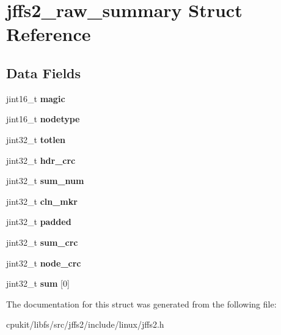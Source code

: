 \hypertarget{structjffs2__raw__summary}{}\section{jffs2\+\_\+raw\+\_\+summary Struct Reference}
\label{structjffs2__raw__summary}
\subsection*{Data Fields}
\begin{DoxyCompactItemize}
\item 
\mbox{\label{structjffs2__raw__summary_a9b7820bedbff940f5115575a9992bb35}} 
jint16\+\_\+t {\bfseries magic}
\item 
\mbox{\label{structjffs2__raw__summary_aae4018b2f35c0c29f6d223e17d5dda13}} 
jint16\+\_\+t {\bfseries nodetype}
\item 
\mbox{\label{structjffs2__raw__summary_abcd5e42e292e2c1759ccd2a9472643d0}} 
jint32\+\_\+t {\bfseries totlen}
\item 
\mbox{\label{structjffs2__raw__summary_a62775979756e2581a7e79e0bac42f211}} 
jint32\+\_\+t {\bfseries hdr\+\_\+crc}
\item 
\mbox{\label{structjffs2__raw__summary_a359312d17fead8288f705d9fe5d4a2c8}} 
jint32\+\_\+t {\bfseries sum\+\_\+num}
\item 
\mbox{\label{structjffs2__raw__summary_a9a6054662576e3c729eef510e163de17}} 
jint32\+\_\+t {\bfseries cln\+\_\+mkr}
\item 
\mbox{\label{structjffs2__raw__summary_a1f91d9fa0eaff87adef86e53db9ee7d0}} 
jint32\+\_\+t {\bfseries padded}
\item 
\mbox{\label{structjffs2__raw__summary_abffafc8e3dfafb53649ae9efe5c6fcb2}} 
jint32\+\_\+t {\bfseries sum\+\_\+crc}
\item 
\mbox{\label{structjffs2__raw__summary_a3f85f8c5d57b21fb49219c4bfc23d822}} 
jint32\+\_\+t {\bfseries node\+\_\+crc}
\item 
\mbox{\label{structjffs2__raw__summary_a7851a3f89086ea8314e73162e7761b00}} 
jint32\+\_\+t {\bfseries sum} \mbox{[}0\mbox{]}
\end{DoxyCompactItemize}


The documentation for this struct was generated from the following file\+:\begin{DoxyCompactItemize}
\item 
cpukit/libfs/src/jffs2/include/linux/jffs2.\+h\end{DoxyCompactItemize}
